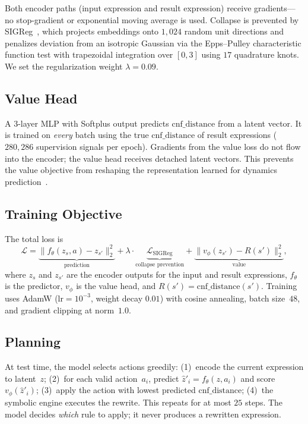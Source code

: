 \documentclass{article}
\begin{document}
Both encoder paths (input expression and result expression) receive
gradients---no stop-gradient or exponential moving average is used.
Collapse is prevented by SIGReg~\cite{balestriero2025lejepa}, which
projects embeddings onto $1{,}024$ random unit directions and penalizes
deviation from an isotropic Gaussian via the Epps--Pulley characteristic
function test with trapezoidal integration over $[0, 3]$ using $17$
quadrature knots. We set the regularization weight $\lambda = 0.09$.

\subsection{Value Head}

A $3$-layer MLP with Softplus output predicts $\text{cnf\_distance}$ from a
latent vector. It is trained on \emph{every} batch using the true
$\text{cnf\_distance}$ of result expressions ($280{,}286$ supervision
signals per epoch). Gradients from the value loss do not flow into the
encoder; the value head receives detached latent vectors. This prevents the
value objective from reshaping the representation learned for dynamics
prediction~\cite{destrade2026valueguided}.

\subsection{Training Objective}

The total loss is
\begin{equation}
\mathcal{L} = \underbrace{\lVert f_\theta(z_s, a) - z_{s'} \rVert_2^2}_{
\text{prediction}} + \lambda \cdot \underbrace{
\mathcal{L}_{\text{SIGReg}}}_{\text{collapse prevention}} +
\underbrace{\lVert v_\phi(z_{s'}) - R(s') \rVert_2^2}_{\text{value}},
\end{equation}
where $z_s$ and $z_{s'}$ are the encoder outputs for the input and result
expressions, $f_\theta$ is the predictor, $v_\phi$ is the value head, and
$R(s') = \text{cnf\_distance}(s')$. Training uses AdamW
($\text{lr} = 10^{-3}$, weight decay $0.01$) with cosine annealing,
batch size~$48$, and gradient clipping at norm~$1.0$.

\subsection{Planning}

At test time, the model selects actions greedily:
(1)~encode the current expression to latent~$z$;
(2)~for each valid action~$a_i$, predict $\hat{z}'_i = f_\theta(z, a_i)$
and score $v_\phi(\hat{z}'_i)$;
(3)~apply the action with lowest predicted $\text{cnf\_distance}$;
(4)~the symbolic engine executes the rewrite.
This repeats for at most $25$ steps. The model decides \emph{which} rule
to apply; it never produces a rewritten expression.
\end{document}
